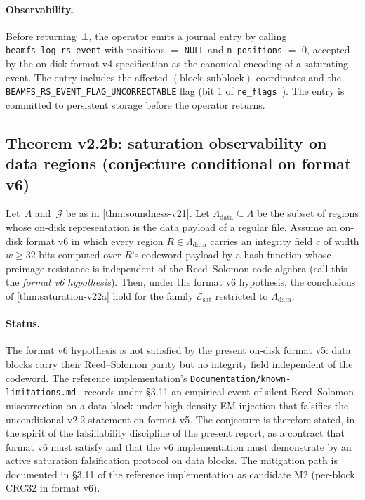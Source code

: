 \paragraph{Observability.}
Before returning~\(\bot\), the operator emits a journal entry by
calling \texttt{beamfs\_log\_rs\_event} with positions \(=\)
\texttt{NULL} and \texttt{n\_positions} \(=\) 0, accepted by the
on-disk format v4 specification as the canonical encoding of a
saturating event. The entry includes the affected
\((\text{block},\text{subblock})\) coordinates and the
\texttt{BEAMFS\_RS\_EVENT\_FLAG\_UNCORRECTABLE} flag (bit 1 of
\texttt{re\_flags}~\cite{beamfs-impl}). The entry is committed to
persistent storage before the operator returns.

\subsection{Theorem v2.2b: saturation observability on data regions
(conjecture conditional on format v6)}

\begin{theorem}\label{thm:saturation-v22b}
Let~\(\Lambda\) and~\(\mathcal{G}\) be as in
\cref{thm:soundness-v21}. Let \(\Lambda_{\mathrm{data}} \subseteq \Lambda\)
be the subset of regions whose on-disk representation is the data
payload of a regular file. Assume an on-disk format v6 in which
every region \(R \in \Lambda_{\mathrm{data}}\) carries an integrity
field \(c\) of width \(w \geq 32\) bits computed over \(R\)'s
codeword payload by a hash function whose preimage resistance is
independent of the Reed--Solomon code algebra (call this the
\emph{format v6 hypothesis}). Then, under the format v6 hypothesis,
the conclusions of \cref{thm:saturation-v22a} hold for the family
\(\mathcal{E}_{\mathrm{sat}}\) restricted to \(\Lambda_{\mathrm{data}}\).
\end{theorem}

\paragraph{Status.}
The format v6 hypothesis is not satisfied by the present on-disk
format v5: data blocks carry their Reed--Solomon parity but no
integrity field independent of the codeword. The reference
implementation's
\texttt{Documentation/known-limitations.md}~\cite{beamfs-impl}
records under \S3.11 an empirical event of silent Reed--Solomon
miscorrection on a data block under high-density EM injection that
falsifies the unconditional v2.2 statement on format v5. The
conjecture is therefore stated, in the spirit of the falsifiability
discipline of the present report, as a contract that format v6
must satisfy and that the v6 implementation must demonstrate by an
active saturation falsification protocol on data blocks. The
mitigation path is documented in \S3.11 of the reference
implementation as candidate M2 (per-block CRC32 in format v6).

